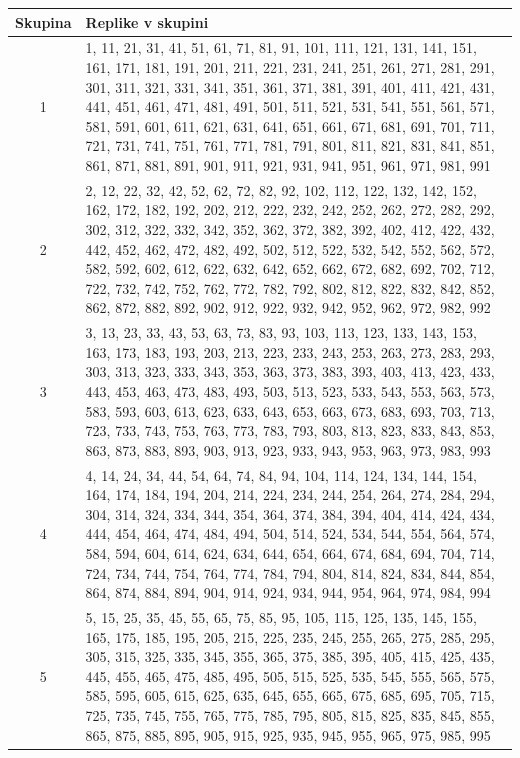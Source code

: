 \documentclass[a4paper, 12pt]{book}
\begin{document}
\begin{appendices}
\begin{table}
\tiny
  \begin{center}
    \begin{tabulary}{1.0\textwidth}{C p{11.80cm}}
      {\scriptsize Skupina} & {\scriptsize Replike v skupini} \\
       & 1, 11, 21, 31, 41, 51, 61, 71, 81, 91, 101, 111, 121, 131, 141, 151, 161, 171, 181, 191, 201, 211, 221, 231, 241, 251, 261, 271, 281, 291, 301, 311, 321, 331, 341, 351, 361, 371, 381, 391, 401, 411, 421, 431, 441, 451, 461, 471, 481, 491, 501, 511, 521, 531, 541, 551, 561, 571, 581, 591, 601, 611, 621, 631, 641, 651, 661, 671, 681, 691, 701, 711, 721, 731, 741, 751, 761, 771, 781, 791, 801, 811, 821, 831, 841, 851, 861, 871, 881, 891, 901, 911, 921, 931, 941, 951, 961, 971, 981, 991 \\
      2 & 2, 12, 22, 32, 42, 52, 62, 72, 82, 92, 102, 112, 122, 132, 142, 152, 162, 172, 182, 192, 202, 212, 222, 232, 242, 252, 262, 272, 282, 292, 302, 312, 322, 332, 342, 352, 362, 372, 382, 392, 402, 412, 422, 432, 442, 452, 462, 472, 482, 492, 502, 512, 522, 532, 542, 552, 562, 572, 582, 592, 602, 612, 622, 632, 642, 652, 662, 672, 682, 692, 702, 712, 722, 732, 742, 752, 762, 772, 782, 792, 802, 812, 822, 832, 842, 852, 862, 872, 882, 892, 902, 912, 922, 932, 942, 952, 962, 972, 982, 992 \\
      3 & 3, 13, 23, 33, 43, 53, 63, 73, 83, 93, 103, 113, 123, 133, 143, 153, 163, 173, 183, 193, 203, 213, 223, 233, 243, 253, 263, 273, 283, 293, 303, 313, 323, 333, 343, 353, 363, 373, 383, 393, 403, 413, 423, 433, 443, 453, 463, 473, 483, 493, 503, 513, 523, 533, 543, 553, 563, 573, 583, 593, 603, 613, 623, 633, 643, 653, 663, 673, 683, 693, 703, 713, 723, 733, 743, 753, 763, 773, 783, 793, 803, 813, 823, 833, 843, 853, 863, 873, 883, 893, 903, 913, 923, 933, 943, 953, 963, 973, 983, 993 \\
      4 & 4, 14, 24, 34, 44, 54, 64, 74, 84, 94, 104, 114, 124, 134, 144, 154, 164, 174, 184, 194, 204, 214, 224, 234, 244, 254, 264, 274, 284, 294, 304, 314, 324, 334, 344, 354, 364, 374, 384, 394, 404, 414, 424, 434, 444, 454, 464, 474, 484, 494, 504, 514, 524, 534, 544, 554, 564, 574, 584, 594, 604, 614, 624, 634, 644, 654, 664, 674, 684, 694, 704, 714, 724, 734, 744, 754, 764, 774, 784, 794, 804, 814, 824, 834, 844, 854, 864, 874, 884, 894, 904, 914, 924, 934, 944, 954, 964, 974, 984, 994 \\
      5 & 5, 15, 25, 35, 45, 55, 65, 75, 85, 95, 105, 115, 125, 135, 145, 155, 165, 175, 185, 195, 205, 215, 225, 235, 245, 255, 265, 275, 285, 295, 305, 315, 325, 335, 345, 355, 365, 375, 385, 395, 405, 415, 425, 435, 445, 455, 465, 475, 485, 495, 505, 515, 525, 535, 545, 555, 565, 575, 585, 595, 605, 615, 625, 635, 645, 655, 665, 675, 685, 695, 705, 715, 725, 735, 745, 755, 765, 775, 785, 795, 805, 815, 825, 835, 845, 855, 865, 875, 885, 895, 905, 915, 925, 935, 945, 955, 965, 975, 985, 995 \\

\end{tabulary}
\end{center}
\end{table}
\end{appendices}
\end{document}
